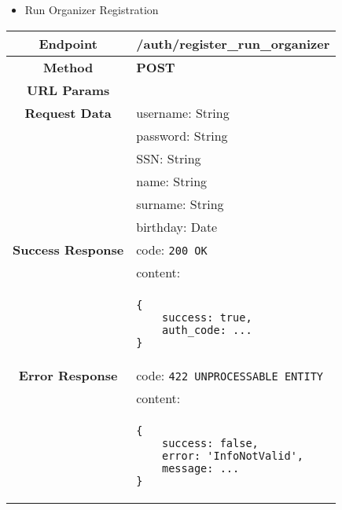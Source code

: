 \begin{itemize}
        \item Run Organizer Registration
    \end{itemize}
    \begin{adjustwidth}{1cm}{}
        \begin{longtable}{|c|l|}
            \hline
            \textbf{Endpoint} & /auth/register\_run\_organizer \\
            \hline
            \textbf{Method} & \textbf{POST} \\
            \hline
            \textbf{URL Params} &  \\
            \hline
            \textbf{Request Data} & username: String \\
            &                 password: String \\
            &                 SSN: String \\
            &                 name: String \\
            &                 surname: String \\
            &                 birthday: Date \\
            \hline
            \textbf{Success Response} & code: \texttt{200 OK} \\
            &                           content: \\
            & \begin{minipage}[t]{0.5\textwidth}
                \begin{adjustwidth}{1.5cm}{}
                \begin{verbatim}
{
    success: true, 
    auth_code: ...
}
                \end{verbatim}
                \end{adjustwidth}
              \end{minipage} \\
              \hline
            \textbf{Error Response} & code: \texttt{422 UNPROCESSABLE ENTITY} \\
            &                         content: \\
            & \begin{minipage}[t]{0.7\textwidth}
                \begin{adjustwidth}{1.5cm}{}
                \begin{verbatim}
{
    success: false, 
    error: 'InfoNotValid',
    message: ...
}
                \end{verbatim}

\end{adjustwidth}
\end{minipage}
\end{longtable}
\end{adjustwidth}
